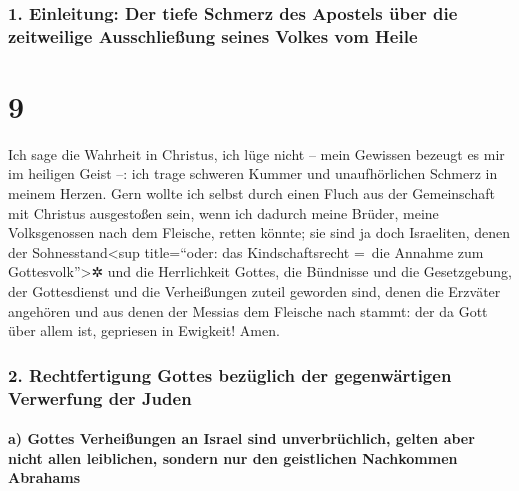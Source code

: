 \hypertarget{einleitung-der-tiefe-schmerz-des-apostels-uxfcber-die-zeitweilige-ausschlieuxdfung-seines-volkes-vom-heile}{%
\subsubsection{1. Einleitung: Der tiefe Schmerz des Apostels über die
zeitweilige Ausschließung seines Volkes vom
Heile}\label{einleitung-der-tiefe-schmerz-des-apostels-uxfcber-die-zeitweilige-ausschlieuxdfung-seines-volkes-vom-heile}}

\hypertarget{section-8}{%
\section{9}\label{section-8}}

 Ich sage die Wahrheit in Christus, ich lüge nicht -- mein
Gewissen bezeugt es mir im heiligen Geist --:  ich trage
schweren Kummer und unaufhörlichen Schmerz in meinem Herzen.
 Gern wollte ich selbst durch einen Fluch aus der
Gemeinschaft mit Christus ausgestoßen sein, wenn ich dadurch meine
Brüder, meine Volksgenossen nach dem Fleische, retten könnte;
 sie sind ja doch Israeliten, denen der
Sohnesstand\textless sup title=``oder: das Kindschaftsrecht =~die
Annahme zum Gottesvolk''\textgreater✲ und die Herrlichkeit Gottes, die
Bündnisse und die Gesetzgebung, der Gottesdienst und die Verheißungen
zuteil geworden sind,  denen die Erzväter angehören und
aus denen der Messias dem Fleische nach stammt: der da Gott über allem
ist, gepriesen in Ewigkeit! Amen.

\hypertarget{rechtfertigung-gottes-bezuxfcglich-der-gegenwuxe4rtigen-verwerfung-der-juden}{%
\subsubsection{2. Rechtfertigung Gottes bezüglich der gegenwärtigen
Verwerfung der
Juden}\label{rechtfertigung-gottes-bezuxfcglich-der-gegenwuxe4rtigen-verwerfung-der-juden}}

\hypertarget{a-gottes-verheiuxdfungen-an-israel-sind-unverbruxfcchlich-gelten-aber-nicht-allen-leiblichen-sondern-nur-den-geistlichen-nachkommen-abrahams}{%
\paragraph{a) Gottes Verheißungen an Israel sind unverbrüchlich, gelten
aber nicht allen leiblichen, sondern nur den geistlichen Nachkommen
Abrahams}\label{a-gottes-verheiuxdfungen-an-israel-sind-unverbruxfcchlich-gelten-aber-nicht-allen-leiblichen-sondern-nur-den-geistlichen-nachkommen-abrahams}}

